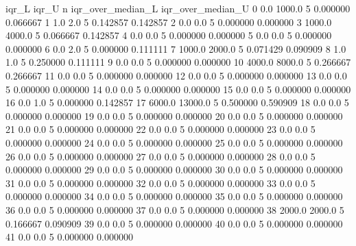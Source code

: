 \begin{APACode}
     iqr_L    iqr_U  n  iqr_over_median_L  iqr_over_median_U  
0      0.0   1000.0  5           0.000000           0.066667  
1      1.0      2.0  5           0.142857           0.142857  
2      0.0      0.0  5           0.000000           0.000000  
3   1000.0   4000.0  5           0.066667           0.142857  
4      0.0      0.0  5           0.000000           0.000000  
5      0.0      0.0  5           0.000000           0.000000  
6      0.0      2.0  5           0.000000           0.111111  
7   1000.0   2000.0  5           0.071429           0.090909  
8      1.0      1.0  5           0.250000           0.111111  
9      0.0      0.0  5           0.000000           0.000000  
10  4000.0   8000.0  5           0.266667           0.266667  
11     0.0      0.0  5           0.000000           0.000000  
12     0.0      0.0  5           0.000000           0.000000  
13     0.0      0.0  5           0.000000           0.000000  
14     0.0      0.0  5           0.000000           0.000000  
15     0.0      0.0  5           0.000000           0.000000  
16     0.0      1.0  5           0.000000           0.142857  
17  6000.0  13000.0  5           0.500000           0.590909  
18     0.0      0.0  5           0.000000           0.000000  
19     0.0      0.0  5           0.000000           0.000000  
20     0.0      0.0  5           0.000000           0.000000  
21     0.0      0.0  5           0.000000           0.000000  
22     0.0      0.0  5           0.000000           0.000000  
23     0.0      0.0  5           0.000000           0.000000  
24     0.0      0.0  5           0.000000           0.000000  
25     0.0      0.0  5           0.000000           0.000000  
26     0.0      0.0  5           0.000000           0.000000  
27     0.0      0.0  5           0.000000           0.000000  
28     0.0      0.0  5           0.000000           0.000000  
29     0.0      0.0  5           0.000000           0.000000  
30     0.0      0.0  5           0.000000           0.000000  
31     0.0      0.0  5           0.000000           0.000000  
32     0.0      0.0  5           0.000000           0.000000  
33     0.0      0.0  5           0.000000           0.000000  
34     0.0      0.0  5           0.000000           0.000000  
35     0.0      0.0  5           0.000000           0.000000  
36     0.0      0.0  5           0.000000           0.000000  
37     0.0      0.0  5           0.000000           0.000000  
38  2000.0   2000.0  5           0.166667           0.090909  
39     0.0      0.0  5           0.000000           0.000000  
40     0.0      0.0  5           0.000000           0.000000  
41     0.0      0.0  5           0.000000           0.000000  
\end{APACode}

